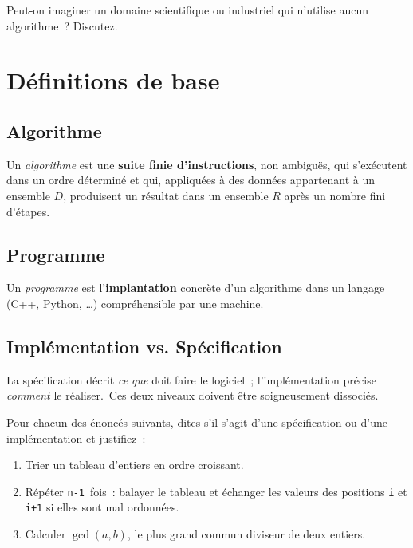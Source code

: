 \begin{reflexion}
Peut‑on imaginer un domaine scientifique ou industriel qui n'utilise aucun
algorithme ? Discutez.
\end{reflexion}

\section{Définitions de base}

\subsection{Algorithme}
Un \emph{algorithme} est une \textbf{suite finie d'instructions}, non ambiguës,
qui s'exécutent dans un ordre déterminé et qui, appliquées à des données
appartenant à un ensemble \(D\), produisent un résultat dans un ensemble
\(R\) après un nombre fini d'étapes.

\subsection{Programme}
Un \emph{programme} est l'\textbf{implantation} concrète d'un algorithme dans un
langage (C++, Python, \dots) compréhensible par une machine.

\subsection{Implémentation vs. Spécification}
La spécification décrit \emph{ce que} doit faire le logiciel ; l'implémentation
précise \emph{comment} le réaliser. Ces deux niveaux doivent être soigneusement
dissociés.

\begin{exercice}
Pour chacun des énoncés suivants, dites s'il s'agit d'une spécification ou
d'une implémentation et justifiez :
\begin{enumerate}[label=\alph*)]
  \item Trier un tableau d'entiers en ordre croissant.
  \item Répéter \lstinline|n-1| fois : balayer le tableau et échanger les valeurs
des positions \lstinline|i| et \lstinline|i+1| si elles sont mal ordonnées.
  \item Calculer \(\gcd(a,b)\), le plus grand commun diviseur de deux entiers.
\end{enumerate}
\end{exercice}


